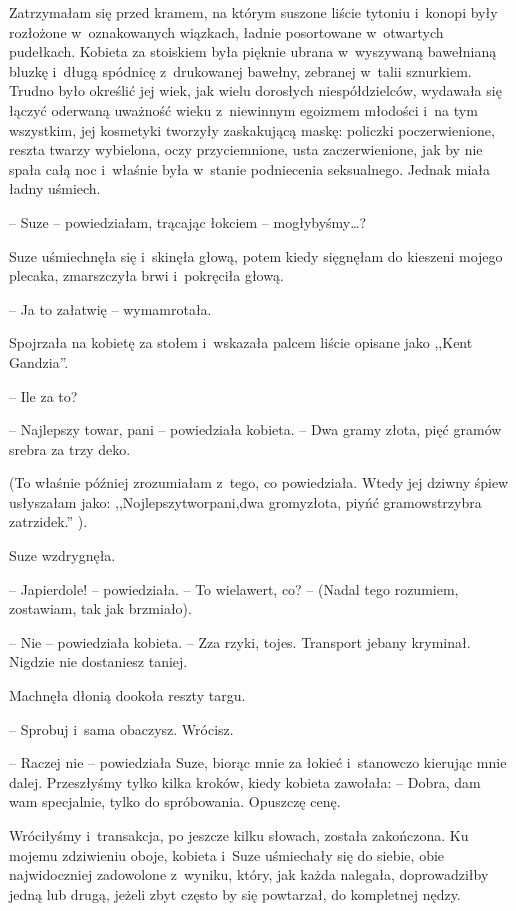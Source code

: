 \documentclass[oneside,polish,11pt,sfheadings]{mwbk}
\begin{document}
Zatrzymałam się przed kramem, na którym suszone liście tytoniu i~konopi
były rozłożone w~oznakowanych wiązkach, ładnie posortowane w~otwartych
pudełkach. Kobieta za stoiskiem była pięknie ubrana w~wyszywaną
bawełnianą bluzkę i~długą spódnicę z~drukowanej bawełny, zebranej w~talii sznurkiem. Trudno było określić jej wiek, jak wielu dorosłych
niespółdzielców, wydawała się łączyć oderwaną uważność wieku z~niewinnym
egoizmem młodości i~na tym wszystkim, jej kosmetyki tworzyły zaskakującą
maskę: policzki poczerwienione, reszta twarzy wybielona, oczy
przyciemnione, usta zaczerwienione, jak by nie spała całą noc i~właśnie
była w~stanie podniecenia seksualnego. Jednak miała ładny uśmiech.

-- Suze -- powiedziałam, trącając łokciem -- mogłybyśmy\ldots ?

Suze uśmiechnęła się i~skinęła głową, potem kiedy sięgnęłam do kieszeni
mojego plecaka, zmarszczyła brwi i~pokręciła głową.

-- Ja to załatwię -- wymamrotała.

Spojrzała na kobietę za stołem i~wskazała palcem liście opisane jako
,,Kent Gandzia''.

-- Ile za to?

-- Najlepszy towar, pani -- powiedziała kobieta. -- Dwa gramy złota, pięć
gramów srebra za trzy deko.

(To właśnie później zrozumiałam z~tego, co powiedziała. Wtedy jej dziwny
śpiew usłyszałam jako: ,,Nojlepszytworpani,dwa gromyzłota, piyńć
gramowstrzybra zatrzidek.'' ).

Suze wzdrygnęła. 

-- Japierdole! -- powiedziała. -- To wielawert, co? -- (Nadal tego rozumiem, zostawiam, tak jak brzmiało).

-- Nie -- powiedziała kobieta. -- Zza rzyki, tojes. Transport jebany
kryminał. Nigdzie nie dostaniesz taniej.

Machnęła dłonią dookoła reszty targu. 

-- Sprobuj i~sama obaczysz. Wrócisz.

-- Raczej nie -- powiedziała Suze, biorąc mnie za łokieć i~stanowczo
kierując mnie dalej. Przeszłyśmy tylko kilka kroków, kiedy kobieta
zawołała: -- Dobra, dam wam specjalnie, tylko do spróbowania. Opuszczę
cenę.

Wróciłyśmy i~transakcja, po jeszcze kilku słowach, została zakończona.
Ku mojemu zdziwieniu oboje, kobieta i~Suze uśmiechały się do siebie,
obie najwidoczniej zadowolone z~wyniku, który, jak każda nalegała,
doprowadziłby jedną lub drugą, jeżeli zbyt często by się powtarzał, do
kompletnej nędzy.
\end{document}
